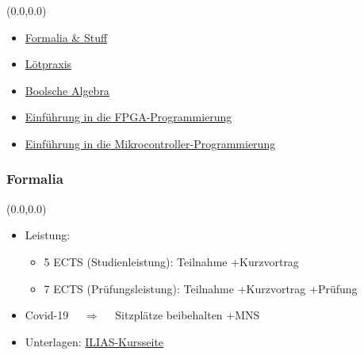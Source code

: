 \documentclass[aspectratio=169, 14pt]{beamer}
\begin{document}
\begin{frame}[label=inhalt]
    \begin{textblock*}{2\paperwidth}(0.0\paperwidth,0.0\paperheight)
        \vspace*{1.9cm}
        \begin{itemize}
            \setlength\itemsep{16pt}
            \item \hyperlink{stuff}{Formalia \& Stuff}
            \item \hyperlink{loetuebung}{Lötpraxis}
            \item \hyperlink{boolschealgebra}{Boolsche Algebra}
            \item \hyperlink{fpga}{Einführung in die FPGA-Programmierung}
            \item \hyperlink{mikrocontroller}{Einführung in die Mikrocontroller-Programmierung}
        \end{itemize}
    \end{textblock*}
    \setcounter{framenumber}{0}
\end{frame}


\begin{frame}[label=stuff]
    \addtocounter{framenumber}{-1}
\end{frame}


\begin{frame}
    \frametitle{Formalia}
    \begin{textblock*}{2\paperwidth}(0.0\paperwidth,0.0\paperheight)
        \vspace*{2.0cm}
        \begin{itemize}
            \setlength\itemsep{16pt}
            \item Leistung:
            \begin{itemize}
                \item 5 ECTS (Studienleistung): Teilnahme +Kurzvortrag
                \item 7 ECTS (Prüfungsleistung): Teilnahme +Kurzvortrag +Prüfung
            \end{itemize}
            \item Covid-19 $\quad\Rightarrow\quad$ Sitzplätze beibehalten +MNS
            \item Unterlagen: \textcolor{uniblau}{\href{https://ilias.uni-freiburg.de/ilias.php?ref_id=1481157&cmdClass=ilrepositorygui&cmdNode=yh&baseClass=ilrepositorygui}{ILIAS-Kursseite}}
        \end{itemize}
    \end{textblock*}
    \framenumber
\end{frame}
\end{document}
